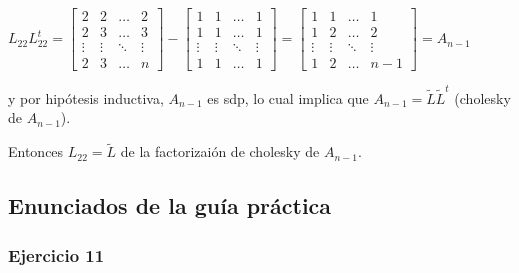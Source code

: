 \begin{itemize}
\begin{itemize}
        $L_{22}L_{22}^{t} = 
        \begin{bmatrix} 
            2 & 2 &\ldots & 2 \\
            2 & 3 &\ldots & 3 \\
            \vdots & \vdots & \ddots & \vdots \\
            2 & 3 & \ldots & n
        \end{bmatrix}
        -
        \begin{bmatrix} 
            1 & 1 &\ldots & 1 \\
            1 & 1 &\ldots & 1 \\
            \vdots & \vdots & \ddots & \vdots \\
            1 & 1 & \ldots & 1
        \end{bmatrix}
        =
        \begin{bmatrix} 
            1 & 1 &\ldots & 1 \\
            1 & 2 &\ldots & 2 \\
            \vdots & \vdots & \ddots & \vdots \\
            1 & 2 & \ldots & n-1
        \end{bmatrix}
        =
        A_{n-1}
        $
    \end{itemize}

    y por hipótesis inductiva, $A_{n-1}$ es sdp, lo cual implica que $A_{n-1} = \widetilde{L}\widetilde{L}^{t}$ (cholesky de $A_{n-1}$).

    Entonces $L_{22} = \widetilde{L}$ de la factorizaión de cholesky de $A_{n-1}$.

\end{itemize}

\subsection{Enunciados de la guía práctica}\label{subsec:enunciados_guia_3_cholesky}



\subsubsection{Ejercicio 11}\label{subsubsec:guia_3_ej_11}